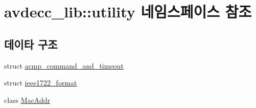 \hypertarget{namespaceavdecc__lib_1_1utility}{}\section{avdecc\+\_\+lib\+:\+:utility 네임스페이스 참조}
\label{namespaceavdecc__lib_1_1utility}
\subsection*{데이타 구조}
\begin{DoxyCompactItemize}
\item 
struct \hyperlink{structavdecc__lib_1_1utility_1_1acmp__command__and__timeout}{acmp\+\_\+command\+\_\+and\+\_\+timeout}
\item 
struct \hyperlink{structavdecc__lib_1_1utility_1_1ieee1722__format}{ieee1722\+\_\+format}
\item 
class \hyperlink{classavdecc__lib_1_1utility_1_1_mac_addr}{Mac\+Addr}
\end{DoxyCompactItemize}
